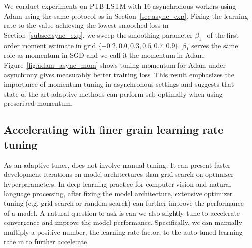 We conduct experiments on PTB LSTM with 16 asynchronous workers using Adam using the same protocol as in Section~\ref{sec:async_exp}.
Fixing the learning rate to the value achieving the lowest smoothed loss in Section~\ref{subsec:sync_exp}, we sweep the smoothing parameter $\beta_1$~\citep{kingma2014adam} of the first order moment estimate in grid $\{-0.2, 0.0, 0.3, 0.5, 0.7, 0.9\}$. $\beta_1$ serves the same role as momentum in SGD and we call it the momentum in Adam. Figure~\ref{fig:adam_async_mom} shows tuning momentum for Adam under asynchrony gives measurably better training loss. 
This result emphasizes the importance of momentum tuning in asynchronous settings and suggests that state-of-the-art adaptive methods can perform sub-optimally when using prescribed momentum.

\subsection{Accelerating \tuner with finer grain learning rate tuning}
\label{sec:boost_exp}
 As an adaptive tuner, \tuner does not involve manual tuning. It can present faster development iterations on model architectures than grid search on optimizer hyperparameters. In deep learning practice for computer vision and natural language processing, after fixing the model architecture, extensive optimizer tuning (e.g. grid search or random search) can further improve the performance of a model. A natural question to ask is can we also slightly tune \tuner to accelerate convergence and improve the model performance. Specifically, we can manually multiply a positive number, the learning rate factor, to the auto-tuned learning rate in \tuner to further accelerate. 
 
